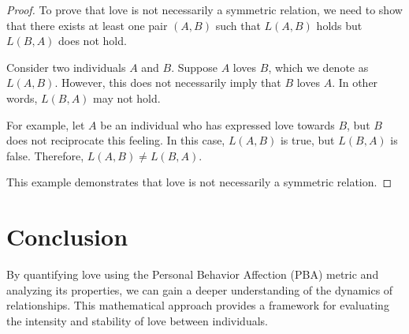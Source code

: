 \documentclass{article}
\begin{document}
\begin{proof}
    To prove that love is not necessarily a symmetric relation, we need to show that there exists at least one pair $(A, B)$ such that $L(A, B)$ holds but $L(B, A)$ does not hold.

    Consider two individuals $A$ and $B$. Suppose $A$ loves $B$, which we denote as $L(A, B)$. However, this does not necessarily imply that $B$ loves $A$. In other words, $L(B, A)$ may not hold.

    For example, let $A$ be an individual who has expressed love towards $B$, but $B$ does not reciprocate this feeling. In this case, $L(A, B)$ is true, but $L(B, A)$ is false. Therefore, $L(A, B) \neq L(B, A)$.

    This example demonstrates that love is not necessarily a symmetric relation.
\end{proof}

\section{Conclusion}
By quantifying love using the Personal Behavior Affection (PBA) metric and analyzing its properties, we can gain a deeper understanding of the dynamics of relationships. This mathematical approach provides a framework for evaluating the intensity and stability of love between individuals.
\end{document}
